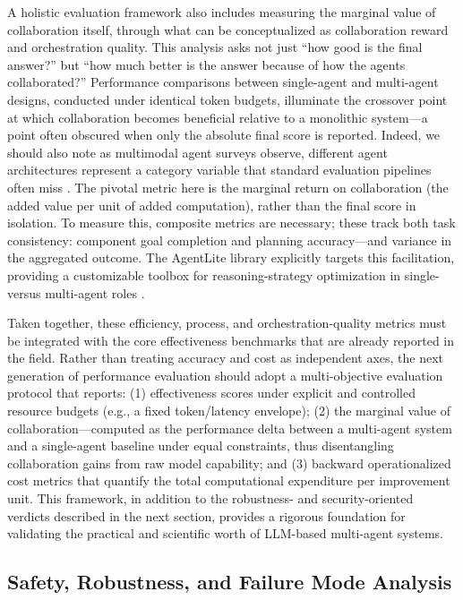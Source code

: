 \documentclass[11pt,a4paper]{article}
\begin{document}
A holistic evaluation framework also includes measuring the marginal value of collaboration itself, through what can be conceptualized as collaboration reward and orchestration quality. This analysis asks not just ``how good is the final answer?'' but ``how much better is the answer because of how the agents collaborated?'' Performance comparisons between single-agent and multi-agent designs, conducted under identical token budgets, illuminate the crossover point at which collaboration becomes beneficial relative to a monolithic system---a point often obscured when only the absolute final score is reported. Indeed, we should also note as multimodal agent surveys observe, different agent architectures represent a category variable that standard evaluation pipelines often miss \cite{arxiv:2402.15116v1}. The pivotal metric here is the marginal return on collaboration (the added value per unit of added computation), rather than the final score in isolation. To measure this, composite metrics are necessary; these track both task consistency: component goal completion and planning accuracy---and variance in the aggregated outcome. The AgentLite library explicitly targets this facilitation, providing a customizable toolbox for reasoning-strategy optimization in single- versus multi-agent roles \cite{arxiv:2402.15538v1}.

Taken together, these efficiency, process, and orchestration-quality metrics must be integrated with the core effectiveness benchmarks that are already reported in the field. Rather than treating accuracy and cost as independent axes, the next generation of performance evaluation should adopt a multi-objective evaluation protocol that reports: (1) effectiveness scores under explicit and controlled resource budgets (e.g., a fixed token/latency envelope); (2) the marginal value of collaboration---computed as the performance delta between a multi-agent system and a single-agent baseline under equal constraints, thus disentangling collaboration gains from raw model capability; and (3) backward operationalized cost metrics that quantify the total computational expenditure per improvement unit. This framework, in addition to the robustness- and security-oriented verdicts described in the next section, provides a rigorous foundation for validating the practical and scientific worth of LLM-based multi-agent systems.


\subsection{Safety, Robustness, and Failure Mode Analysis}
\end{document}
